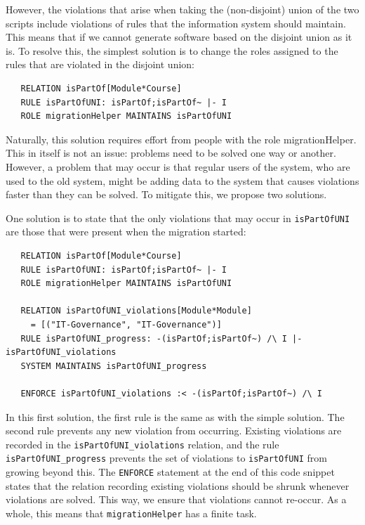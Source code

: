 \documentclass{elsarticle}
\begin{document}
However, the violations that arise when taking the (non-disjoint) union of the two scripts include violations of rules that the information system should maintain.
This means that if we cannot generate software based on the disjoint union as it is.
To resolve this, the simplest solution is to change the roles assigned to the rules that are violated in the disjoint union:
\begin{verbatim}
   RELATION isPartOf[Module*Course]
   RULE isPartOfUNI: isPartOf;isPartOf~ |- I
   ROLE migrationHelper MAINTAINS isPartOfUNI
\end{verbatim}

Naturally, this solution requires effort from people with the role migrationHelper.
This in itself is not an issue: problems need to be solved one way or another.
However, a problem that may occur is that regular users of the system, who are used to the old system, might be adding data to the system that causes violations faster than they can be solved.
To mitigate this, we propose two solutions.

One solution is to state that the only violations that may occur in \verb=isPartOfUNI= are those that were present when the migration started:
\begin{verbatim}
   RELATION isPartOf[Module*Course]
   RULE isPartOfUNI: isPartOf;isPartOf~ |- I
   ROLE migrationHelper MAINTAINS isPartOfUNI
   
   RELATION isPartOfUNI_violations[Module*Module]
     = [("IT-Governance", "IT-Governance")]
   RULE isPartOfUNI_progress: -(isPartOf;isPartOf~) /\ I |- isPartOfUNI_violations
   SYSTEM MAINTAINS isPartOfUNI_progress
   
   ENFORCE isPartOfUNI_violations :< -(isPartOf;isPartOf~) /\ I  
\end{verbatim}

In this first solution, the first rule is the same as with the simple solution.
The second rule prevents any new violation from occurring.
Existing violations are recorded in the \verb=isPartOfUNI_violations= relation, and the rule \verb=isPartOfUNI_progress= prevents the set of violations to \verb=isPartOfUNI= from growing beyond this.
The \verb=ENFORCE= statement at the end of this code snippet states that the relation recording existing violations should be shrunk whenever violations are solved.
This way, we ensure that violations cannot re-occur.
As a whole, this means that \verb=migrationHelper= has a finite task.
\end{document}
